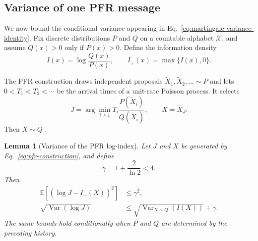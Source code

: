 \documentclass{article}
\theoremstyle{plain}
\newtheorem{lemma}[theorem]{Lemma}
\theoremstyle{definition}
\theoremstyle{remark}
\begin{document}
\subsection{Variance of one PFR message}

We now bound the conditional variance appearing in Eq.~\eqref{eq:martingale-variance-identity}. Fix discrete distributions $P$ and $Q$ on a countable alphabet $\mathcal X$, and assume $Q(x)>0$ only if $P(x)>0$. Define the information density
\begin{equation}
    I(x)
    =
    \log\frac{Q(x)}{P(x)},
    \qquad
    I_+(x)
    =
    \max\{I(x),0\}.
\end{equation}

The PFR construction draws independent proposals $\widetilde X_1,\widetilde X_2,\ldots\sim P$ and lets $0<T_1<T_2<\cdots$ be the arrival times of a unit-rate Poisson process. It selects
\begin{equation}
    J
    =
    \arg\min_{i\geq1}
    T_i\frac{P(\widetilde X_i)}{Q(\widetilde X_i)},
    \qquad
    X
    =
    \widetilde X_J.
    \label{eq:pfr-construction}
\end{equation}
Then $X\sim Q$ \citep{li2018strong}.

\begin{lemma}[Variance of the PFR log-index]
\label{lem:pfr-log-index-variance}
Let $J$ and $X$ be generated by Eq.~\eqref{eq:pfr-construction}, and define
\begin{equation}
    \gamma
    =
    1+\frac{2}{\ln 2}
    <4.
\end{equation}
Then
\begin{align}
    \mathbb E\left[
      \left(\log J-I_+(X)\right)^2
    \right]
    &\leq
    \gamma^2,
    \label{eq:log-index-residual}
    \\
    \sqrt{\operatorname{Var}(\log J)}
    &\leq
    \sqrt{\operatorname{Var}_{X\sim Q}(I(X))}
    +\gamma.
    \label{eq:log-index-variance}
\end{align}
The same bounds hold conditionally when $P$ and $Q$ are determined by the preceding history.
\end{lemma}
\end{document}

